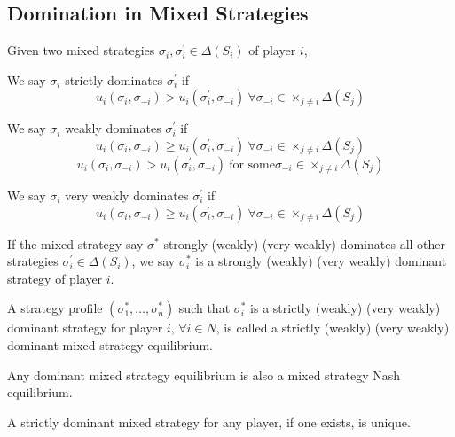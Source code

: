\subsection{Domination in Mixed Strategies}
\begin{defn}
	Given two mixed strategies $\sigma_i,\sigma_i^\prime\in \Delta(S_i)$ of player $i$,

	We say $\sigma_i$ strictly dominates $\sigma_i^\prime$ if
	\[u_i(\sigma_i,\sigma_{-i})>u_i(\sigma_i^\prime,\sigma_{-i}) \ \forall\sigma_{-i}\in \times_{j\neq i}\Delta(S_j)\]

	We say $\sigma_i$ weakly dominates $\sigma_i^\prime$ if
	\[u_i(\sigma_i,\sigma_{-i})\geq u_i(\sigma_i^\prime,\sigma_{-i}) \ \forall\sigma_{-i}\in \times_{j\neq i}\Delta(S_j)\]
	\[u_i(\sigma_i,\sigma_{-i})>u_i(\sigma_i^\prime,\sigma_{-i}) \ \text{for some} \sigma_{-i}\in \times_{j\neq i}\Delta(S_j)\]

	We say $\sigma_i$ very weakly dominates $\sigma_i^\prime$ if
	\[u_i(\sigma_i,\sigma_{-i})\geq u_i(\sigma_i^\prime,\sigma_{-i}) \ \forall\sigma_{-i}\in \times_{j\neq i}\Delta(S_j)\]
\end{defn}
\begin{defn}
	If the mixed strategy say $\sigma^*$ strongly (weakly) (very weakly) dominates all other strategies $\sigma_i^\prime\in\Delta(S_i)$, we say $\sigma_i^*$ is a strongly (weakly) (very weakly) dominant strategy of player $i$.

	A strategy profile $(\sigma_1^*,\ldots,\sigma_n^*)$ such that $\sigma^*_i$ is a strictly (weakly) (very weakly) dominant strategy for player $i$, $\forall i \in N$, is called a strictly (weakly) (very weakly) dominant mixed strategy equilibrium.
\end{defn}
\begin{note}
	Any dominant mixed strategy equilibrium is also a mixed strategy Nash equilibrium.
\end{note}
\begin{note}
	A strictly dominant mixed strategy for any player, if one exists, is unique.
\end{note}
